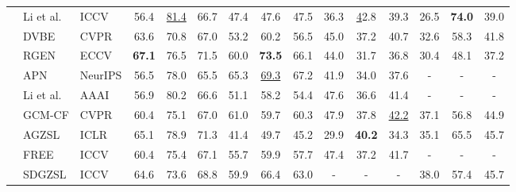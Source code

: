 \documentclass{article}
\begin{document}
\begin{table*}[t]
{\begin{tabular}{@{}cllcccccccccccc}
\multicolumn{1}{c|}{\multirow{4}{*}{}} 			&Li et al.               & ICCV \cite{li2019rethinking}            & 56.4          & \underline{81.4} & 66.7          & 47.4          & 47.6          & 47.5          & 36.3          & {\ul 42.8}    & 39.3          & 26.5          & \textbf{74.0}    & 39.0          \\
   \multicolumn{1}{c|}{}		&DVBE                   &CVPR \cite{xu2020attribute}    &63.6 &70.8 &67.0 &53.2 &60.2 &56.5  &45.0 &37.2 &40.7  &32.6 &58.3 &41.8\\
   \multicolumn{1}{c|}{}	&RGEN &ECCV\cite{xie2020region} &{\bf 67.1} &76.5 &71.5  &60.0 &{\bf 73.5} &66.1 &44.0 &31.7 &36.8 &30.4 &48.1 &37.2\\
	\multicolumn{1}{c|}{}		&APN                   & NeurIPS \cite{min2020domain}                       &56.5 &78.0 &65.5        & 65.3 &\underline{69.3} &67.2     &41.9 &34.0 &37.6     & -             & -             & -             \\
\midrule
\midrule
\multicolumn{1}{c|}{\multirow{9}{*}{}}  	&Li et al.               & AAAI \cite{li2021generalized}            & 56.9          & 80.2    & 66.6          & 51.1          & 58.2          & 54.4          & 47.6          & 36.6          & 41.4          & -             & -             & -             \\
\multicolumn{1}{c|}{}        &GCM-CF   &CVPR \cite{yue2021counterfactual}        &60.4 &75.1 &67.0  &61.0 &59.7 &60.3    &47.9 &37.8 &\underline{42.2}   &37.1 &56.8 &44.9\\
 \multicolumn{1}{c|}{}		&AGZSL                   & ICLR \cite{chou2020adaptive}                       & 65.1          & 78.9          &71.3          & 41.4          & 49.7          &45.2         & 29.9           & {\bf 40.2}           &34.3          &35.1 &65.5 &45.7  \\
	\multicolumn{1}{c|}{}			&FREE                    & ICCV \cite{chen2021free}              & 60.4          & 75.4          & 67.1          & 55.7          & 59.9          & 57.7          & 47.4          & 37.2          & 41.7          & -             & -             & -             \\
\multicolumn{1}{c|}{}		&SDGZSL                  & ICCV \cite{chen2021semantics}        & 64.6 & 73.6 & 68.8                     & 59.9                     & 66.4                     & 63.0                     & -                        & -                        & -                        & 38.0                     & 57.4                     & 45.7                     \\

\end{tabular}}
\end{table*}
\end{document}
